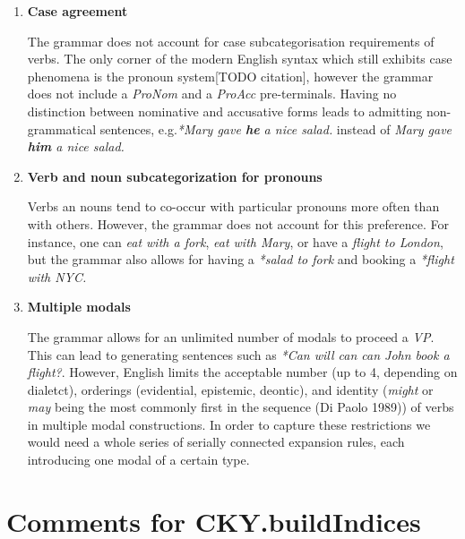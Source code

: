 \documentclass{article}
\begin{document}
\begin{enumerate}
		\item
		\textbf{Case agreement}
		
		The grammar does not account for case subcategorisation requirements of verbs. The only corner of the modern English syntax which still exhibits case phenomena is the pronoun system[TODO citation], however the grammar does not include a \emph{ProNom} and a \emph{ProAcc} pre-terminals. Having no distinction between nominative and accusative forms leads to admitting non-grammatical sentences, e.g.\emph{*Mary gave \textbf{he} a nice salad.} instead of \emph{Mary gave \textbf{him} a nice salad.}
		
		\item
		\textbf{Verb and noun subcategorization for pronouns}
		
		Verbs an nouns tend to co-occur with particular pronouns more often than with others. However, the grammar does not account for this preference. For instance, one can \emph{eat with a fork}, \emph{eat with Mary}, or have a \emph{flight to London}, but the grammar also allows for having a \emph{*salad to fork} and booking a \emph{*flight with NYC.}
		
		\item
		\textbf{Multiple modals}
		
		The grammar allows for an unlimited number of modals to proceed a \emph{VP}. This can lead to generating sentences such as \emph{*Can will can can John book a flight?}. However, English limits the acceptable number (up to 4, depending on dialetct), orderings (evidential, epistemic, deontic), and identity (\emph{might} or \emph{may} being the most commonly first in the sequence (Di Paolo 1989)) of verbs in multiple modal constructions. In order to capture these restrictions we would need a whole series of serially connected expansion rules, each introducing one modal of a certain type.
	\end{enumerate}

\section{Comments for CKY.buildIndices}
\end{document}
